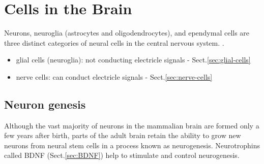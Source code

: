 \chapter{Cells in the Brain}	
\label{chap:cells-CNS}

Neurons, neuroglia (astrocytes and oligodendrocytes), and ependymal cells are
three distinct categories of neural cells in the central nervous system.
\citep{morest2003}.

\begin{itemize}
  \item glial cells (neuroglia): not conducting electricle signals
  - Sect.\ref{sec:glial-cells}
  
 
  \item nerve cells: can conduct electricle signals - Sect.\ref{sec:nerve-cells}
\end{itemize}


\section{Neuron genesis}
\label{sec:neurogenesis}

Although the vast majority of neurons in the mammalian brain are formed only a
few years after birth, parts of the adult brain retain the ability to grow new
neurons from neural stem cells in a process known as neurogenesis. Neurotrophins
called BDNF (Sect.\ref{sec:BDNF}) help to stimulate and control neurogenesis.

